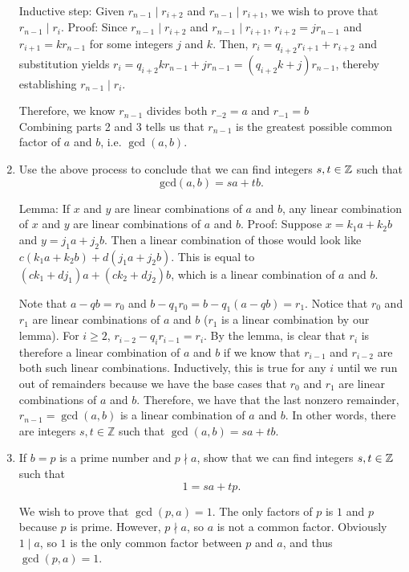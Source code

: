 \documentclass{amsart}
\begin{document}
\begin{enumerate}[itemsep=0.4in]
Inductive step: Given $r_{n-1}\mid r_{i+2}$ and $r_{n-1}\mid r_{i+1}$, we wish to prove that $r_{n-1}\mid r_i$. Proof: Since $r_{n-1}\mid r_{i+2}$ and $r_{n-1}\mid r_{i+1}$, $r_{i+2}=jr_{n-1}$ and $r_{i+1}=kr_{n-1}$ for some integers $j$ and $k$. Then, $r_i=q_{i+2}r_{i+1}+r_{i+2}$ and substitution yields $r_i=q_{i+2}kr_{n-1}+jr_{n-1}=(q_{i+2}k+j)r_{n-1}$, thereby establishing $r_{n-1}\mid r_i$. 

Therefore, we know $r_{n-1}$ divides both $r_{-2}=a$ and $r_{-1}=b$\\

Combining parts 2 and 3 tells us that $r_{n-1}$ is the greatest possible common factor of $a$ and $b$, i.e. $\gcd(a,b)$.


\item Use the above process to conclude that we can find integers $s,t\in\mathbb{Z}$ such that
\[
\mathrm{gcd}(a,b) = sa + tb.
\]

Lemma: If $x$ and $y$ are linear combinations of $a$ and $b$, any linear combination of $x$ and $y$ are linear combinations of $a$ and $b$. Proof: Suppose $x=k_1a+k_2b$ and $y=j_1a+j_2b$. Then a linear combination of those would look like $c(k_1a+k_2b)+d(j_1a+j_2b)$. This is equal to $(ck_1+dj_1)a+(ck_2+dj_2)b$, which is a linear combination of $a$ and $b$.

Note that $a-qb=r_0$ and $b-q_1r_0=b-q_1(a-qb)=r_1$. Notice that $r_0$ and $r_1$ are linear combinations of $a$ and $b$ ($r_1$ is a linear combination by our lemma). For $i\geq2$, $r_{i-2}-q_ir_{i-1}=r_i$. By the lemma, is clear that $r_i$ is therefore a linear combination of $a$ and $b$ if we know that $r_{i-1}$ and $r_{i-2}$ are both such linear combinations. Inductively, this is true for any $i$ until we run out of remainders because we have the base cases that $r_0$ and $r_1$ are linear combinations of $a$ and $b$. Therefore, we have that the last nonzero remainder, $r_{n-1}=\gcd(a,b)$ is a linear combination of $a$ and $b$. In other words, there are integers $s,t\in\mathbb{Z}$ such that $\gcd(a,b)=sa+tb$.


\item If $b=p$ is a prime number and $p\nmid a$, show that we can find integers $s,t\in\mathbb{Z}$ such that
	\[
     1 = sa + tp.
	\]

We wish to prove that $\gcd(p,a)=1$. The only factors of $p$ is $1$ and $p$ because $p$ is prime. However, $p\nmid a$, so $a$ is not a common factor. Obviously $1\mid a$, so $1$ is the only common factor between $p$ and $a$, and thus $\gcd(p,a)=1$.\\


\end{enumerate}
\end{document}
